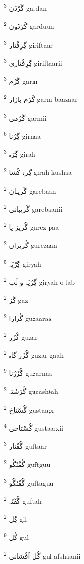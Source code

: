 \documentclass[12pt]{article}
\begin{document}
\begin{multicols}{5}
{\ur گَرْدَن}   \textsuperscript{3} gardan

{\ur گَرْدُون}   \textsuperscript{2} garduun

{\ur گِرِفْتار}   \textsuperscript{3} giriftaar

{\ur گِرِفْتاری}   \textsuperscript{3} giriftaarii

{\ur گَرْم}   \textsuperscript{3} garm

{\ur گَرْم بازار}   \textsuperscript{2} garm-baazaar

{\ur گَرْمی}   \textsuperscript{3} garmii

{\ur گِرْنا}   \textsuperscript{6} girnaa

{\ur گِرَہ}   \textsuperscript{3} girah

{\ur گِرَہ کُشا}   \textsuperscript{2} girah-kushaa

{\ur گَریبان}   \textsuperscript{2} garebaan

{\ur گَریبانی}   \textsuperscript{2} garebaanii

{\ur گُریز پا}   \textsuperscript{2} gurez-paa

{\ur گُریزان}   \textsuperscript{2} gurezaan

{\ur گِرْیَہ}   \textsuperscript{5} giryah

{\ur گِرْیَہ و لَب}   \textsuperscript{2} giryah-o-lab

{\ur گَز}   \textsuperscript{2} gaz

{\ur گُزارا}   \textsuperscript{2} guzaaraa

{\ur گُزَر}   \textsuperscript{2} guzar

{\ur گُزَر گاہ}   \textsuperscript{2} guzar-gaah

{\ur گُزَرْنا}   \textsuperscript{9} guzarnaa

{\ur گُزَشْتَہ}   \textsuperscript{2} guzashtah

{\ur گُسْتاخ}   \textsuperscript{2} gustaa;x

{\ur گُسْتاخی}   \textsuperscript{4} gustaa;xii

{\ur گُفْتار}   \textsuperscript{3} guftaar

{\ur گُفْتْگُو}   \textsuperscript{2} guftguu

{\ur گُفْتَگُو}   \textsuperscript{3} guftaguu

{\ur گُفْتَہ}   \textsuperscript{2} guftah

{\ur گِل}   \textsuperscript{2} gil

{\ur گُل}   \textsuperscript{9} gul

{\ur گُل اَفْشانی}   \textsuperscript{2} gul-afshaanii


\end{multicols}
\end{document}
